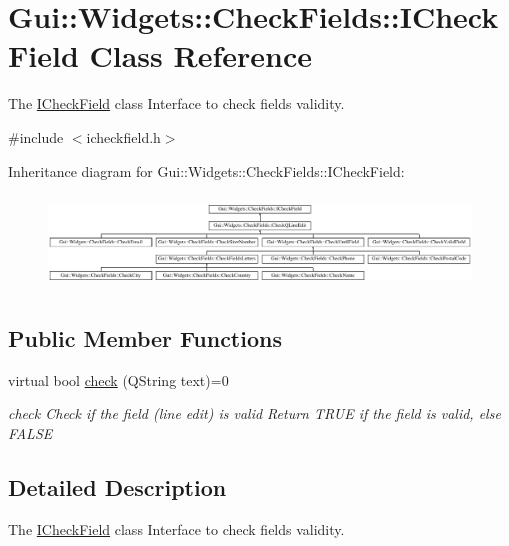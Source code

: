 \hypertarget{classGui_1_1Widgets_1_1CheckFields_1_1ICheckField}{\section{Gui\-:\-:Widgets\-:\-:Check\-Fields\-:\-:I\-Check\-Field Class Reference}
\label{classGui_1_1Widgets_1_1CheckFields_1_1ICheckField}
}


The \hyperlink{classGui_1_1Widgets_1_1CheckFields_1_1ICheckField}{I\-Check\-Field} class Interface to check fields validity.  




{\ttfamily \#include $<$icheckfield.\-h$>$}

Inheritance diagram for Gui\-:\-:Widgets\-:\-:Check\-Fields\-:\-:I\-Check\-Field\-:\begin{figure}[H]
\begin{center}
\leavevmode
\includegraphics[height=2.508961cm]{d7/d93/classGui_1_1Widgets_1_1CheckFields_1_1ICheckField}
\end{center}
\end{figure}
\subsection*{Public Member Functions}
\begin{DoxyCompactItemize}
\item 
virtual bool \hyperlink{classGui_1_1Widgets_1_1CheckFields_1_1ICheckField_a818700a4a8c95eacfc39b85c74e71144}{check} (Q\-String text)=0
\begin{DoxyCompactList}\small\item\em check Check if the field (line edit) is valid Return T\-R\-U\-E if the field is valid, else F\-A\-L\-S\-E \end{DoxyCompactList}\end{DoxyCompactItemize}


\subsection{Detailed Description}
The \hyperlink{classGui_1_1Widgets_1_1CheckFields_1_1ICheckField}{I\-Check\-Field} class Interface to check fields validity. 

